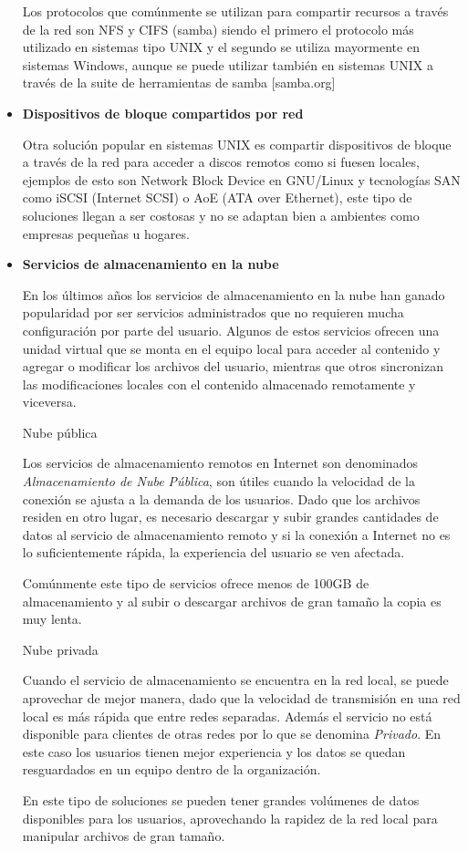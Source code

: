 \begin{itemize}
Los protocolos que com\'{u}nmente se utilizan para compartir recursos a trav\'{e}s de la red son NFS y CIFS (samba) siendo el primero el protocolo m\'{a}s utilizado en sistemas tipo UNIX y el segundo se utiliza mayormente en sistemas Windows, aunque se puede utilizar tambi\'{e}n en sistemas UNIX a trav\'{e}s de la suite de herramientas de samba [samba.org]

      \item \textbf{Dispositivos de bloque compartidos por red}

Otra soluci\'{o}n popular en sistemas UNIX es compartir dispositivos de bloque a trav\'{e}s de la red para acceder a discos remotos como si fuesen locales, ejemplos de esto son Network Block Device en GNU/Linux y tecnolog\'{i}as SAN como iSCSI (Internet SCSI) o AoE (ATA over Ethernet), este tipo de soluciones llegan a ser costosas y no se adaptan bien a ambientes como empresas peque\~{n}as u hogares.
    
      \item \textbf{Servicios de almacenamiento en la nube}

En los \'{u}ltimos a\~{n}os los servicios de almacenamiento en la nube han ganado popularidad por ser servicios administrados que no requieren mucha configuraci\'{o}n por parte del usuario. Algunos de estos servicios ofrecen una unidad virtual que se monta en el equipo local para acceder al contenido y agregar o modificar los archivos del usuario, mientras que otros sincronizan las modificaciones locales con el contenido almacenado remotamente y viceversa.

        \textrm{Nube p\'{u}blica}

Los servicios de almacenamiento remotos en Internet son denominados \emph{Almacenamiento de Nube P\'{u}blica}, son \'{u}tiles cuando la velocidad de la conexi\'{o}n se ajusta a la demanda de los usuarios. Dado que los archivos residen en otro lugar, es necesario descargar y subir grandes cantidades de datos al servicio de almacenamiento remoto y si la conexi\'{o}n a Internet no es lo suficientemente r\'{a}pida, la experiencia del usuario se ven afectada.

Com\'{u}nmente este tipo de servicios ofrece menos de 100GB de almacenamiento y al subir o descargar archivos de gran tama\~{n}o la copia es muy lenta.

        \textrm{Nube privada}

Cuando el servicio de almacenamiento se encuentra en la red local, se puede aprovechar de mejor manera, dado que la velocidad de transmisi\'{o}n en una red local es m\'{a}s r\'{a}pida que entre redes separadas. Adem\'{a}s el servicio no est\'{a} disponible para clientes de otras redes por lo que se denomina \emph{Privado}. En este caso los usuarios tienen mejor experiencia y los datos se quedan resguardados en un equipo dentro de la organizaci\'{o}n.

En este tipo de soluciones se pueden tener grandes vol\'{u}menes de datos disponibles para los usuarios, aprovechando la rapidez de la red local para manipular archivos de gran tama\~{n}o.

    \end{itemize}

